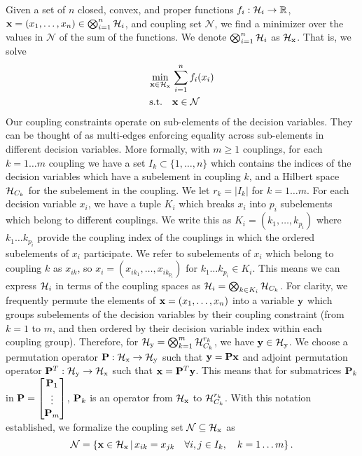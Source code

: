 Given a set of $n$ closed, convex, and proper functions $f_i : \mathcal{H}_i \to \mathbb R$, $\mathbf{x} = \left(x_1, \dots, x_n\right) \in \bigotimes_{i=1}^n \mathcal{H}_i$, and coupling set $\mathcal{N}$, we find a minimizer over the values in $\mathcal{N}$ of the sum of the functions.
We denote $\bigotimes_{i=1}^n \mathcal{H}_i$ as $\mathcal{H}_\text{x}$.
That is, we solve
\begin{align}
    \label{zero_coupled}
    \min_{\mathbf{x} \in \mathcal{H}_\text{x}} \, &\sum_{i=1}^n f_i(x_i) \\
    \text{s.t.} \quad &\mathbf{x} \in \mathcal{N}
\end{align}
Our coupling constraints operate on sub-elements of the decision variables.
They can be thought of as multi-edges enforcing equality across sub-elements in different decision variables.
More formally, with $m \geq 1$ couplings, for each $k = 1 \dots m$ coupling we have a set $I_k \subset \{1, \dots, n\}$ which contains the indices of the decision variables which have a subelement in coupling $k$, and a Hilbert space $\mathcal{H}_{C_k}$ for the subelement in the coupling.
We let $r_k = |I_k|$ for $k = 1 \dots m$.
For each decision variable $x_i$, we have a tuple $K_i$ which breaks $x_i$ into $p_i$ subelements which belong to different couplings. 
We write this as $K_i = \left(k_1, \dots, k_{p_i}\right)$ where $k_1 \dots k_{p_i}$ provide the coupling index of the couplings in which the ordered subelements of $x_i$ participate.
We refer to subelements of $x_i$ which belong to coupling $k$ as $x_{ik}$, so $x_i = \left(x_{ik_1}, \dots, x_{ik_{p_i}}\right)$ for $k_1 \dots k_{p_i} \in K_i$.
This means we can express $\mathcal{H}_i$ in terms of the coupling spaces as $\mathcal{H}_i = \bigotimes_{k \in K_i} \mathcal{H}_{C_k}$.
For clarity, we frequently permute the elements of $\mathbf{x} = \left(x_1, \dots, x_n\right)$ into a variable $\mathbf{y}$ which groups subelements of the decision variables by their coupling constraint (from $k = 1$ to $m$, and then ordered by their decision variable index within each coupling group).
Therefore, for $\mathcal{H}_\text{y} = \bigotimes_{k=1}^m \mathcal{H}_{C_k}^{r_k} $, we have $\mathbf{y} \in \mathcal{H}_\text{y}$.
We choose a permutation operator $\mathbf{P} : \mathcal{H}_\text{x} \to \mathcal{H}_\text{y}$ such that $\mathbf{y} = \mathbf{P} \mathbf{x}$ and adjoint permutation operator $\mathbf{P}^T : \mathcal{H}_\text{y} \to \mathcal{H}_\text{x}$ such that $\mathbf{x} = \mathbf{P}^T\mathbf{y}$.
This means that for submatrices $\mathbf{P}_k$ in $\mathbf{P} = \begin{bmatrix}
    \mathbf{P}_1 \\
    \vdots \\
    \mathbf{P}_m 
\end{bmatrix}$, $\mathbf{P}_k$ is an operator from $\mathcal{H}_\text{x}$ to $\mathcal{H}_{C_k}^{r_k}$.
With this notation established, we formalize the coupling set $\mathcal{N} \subseteq \mathcal{H}_\text{x}$ as 
\begin{equation}\label{coupling_set_def}
    \mathcal{N} = \left\{ \mathbf{x} \in \mathcal{H}_\text{x} \, | \, x_{ik} = x_{jk} \quad \forall i,j \in I_k, \quad k = 1 \dots m\right\}.
\end{equation}

